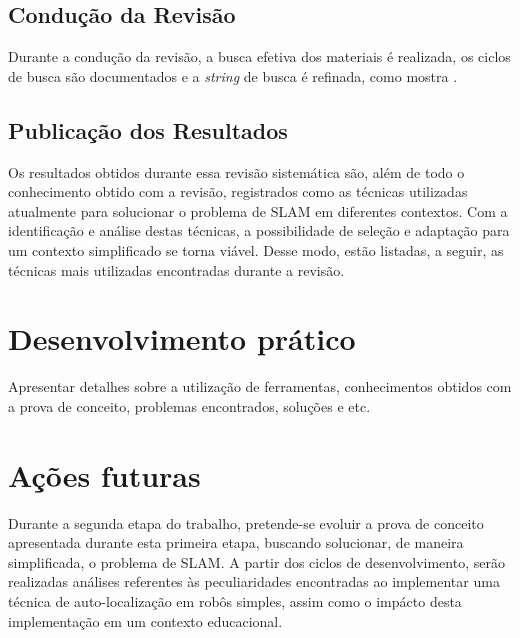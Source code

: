 		

	\subsection{Condução da Revisão} %
	\label{sub:conducaoRevisao}
		
		Durante a condução da revisão, a busca efetiva dos materiais é realizada, os ciclos de busca são documentados e a \textit{string} de busca é refinada, como mostra \cite{estudoPrimarioSecundario}.

	\subsection{Publicação dos Resultados} %
	\label{sub:publicacaoRevisao}
		
		Os resultados obtidos durante essa revisão sistemática são, além de todo o conhecimento obtido com a revisão, registrados como as técnicas utilizadas atualmente para solucionar o problema de SLAM em diferentes contextos. Com a identificação e análise destas técnicas, a possibilidade de seleção e adaptação para um contexto simplificado se torna viável. Desse modo, estão listadas, a seguir, as técnicas mais utilizadas encontradas durante a revisão.




\section{Desenvolvimento prático} %
\label{sec:desenvolvimento_prático}

	Apresentar detalhes sobre a utilização de ferramentas, conhecimentos obtidos com a prova de conceito, problemas encontrados, soluções e etc.

\section{Ações futuras} %
\label{sec:acoes_futuras}

	Durante a segunda etapa do trabalho, pretende-se evoluir a prova de conceito apresentada durante esta primeira etapa, buscando solucionar, de maneira simplificada, o problema de SLAM. A partir dos ciclos de desenvolvimento, serão realizadas análises referentes às peculiaridades encontradas ao implementar uma técnica de auto-localização em robôs simples, assim como o impácto desta implementação em um contexto educacional.

